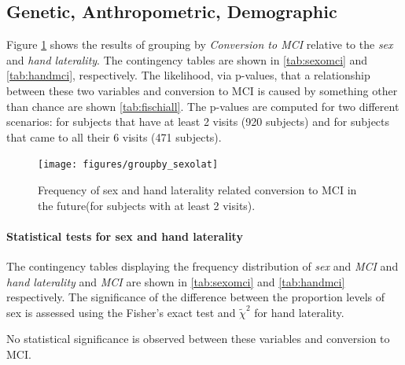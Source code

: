 \documentclass[11pt]{article}
\theoremstyle{definition}
\theoremstyle{remark}
\begin{document}
\subsection{Genetic, Anthropometric, Demographic}


Figure \ref{fig:groupby_sexolat} shows the results of grouping by \emph{Conversion to MCI} relative to the \emph{sex} and \emph{hand laterality}. The contingency tables are shown in \ref{tab:sexomci} and \ref{tab:handmci}, respectively.
The likelihood, via p-values, that a relationship between these two variables and conversion to MCI is caused by something other than chance are shown \ref{tab:fischiall}. The p-values are computed for two different scenarios: for subjects that have at least 2 visits (920 subjects) and for subjects that came to all their 6 visits (471 subjects).

\begin{figure}[H]
        \centering
        \texttt{[image: figures/groupby\_sexolat]}
        \caption{Frequency of sex and hand laterality related conversion to MCI in the future(for subjects with at least 2 visits).} 
        \label{fig:groupby_sexolat}
\end{figure}

\paragraph*{Statistical tests for sex and hand laterality}

The contingency tables displaying the frequency distribution of \emph{sex} and \emph{MCI} and \emph{hand laterality} and \emph{MCI} are shown in \ref{tab:sexomci} and \ref{tab:handmci} respectively. The significance of the difference between the proportion levels of sex is assessed using the Fisher's exact test and  $\tilde{\chi}^2$ for hand laterality.

No statistical significance is observed between these variables and conversion to MCI. 
\end{document}
